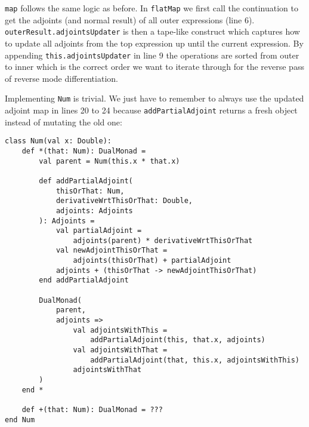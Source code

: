 \lstinline{map} follows the same logic as before. In \lstinline{flatMap} we first call the continuation to get the adjoints (and normal result) of all outer expressions (line 6). \lstinline{outerResult.adjointsUpdater} is then a tape-like construct which captures how to update all adjoints from the top expression up until the current expression. By appending \lstinline{this.adjointsUpdater} in line 9 the operations are sorted from outer to inner which is the correct order we want to iterate through for the reverse pass of reverse mode differentiation.

Implementing \lstinline{Num} is trivial. We just have to remember to always use the updated adjoint map in lines 20 to 24 because \lstinline{addPartialAdjoint} returns a fresh object instead of mutating the old one:
\begin{lstlisting}
class Num(val x: Double):
    def *(that: Num): DualMonad =
        val parent = Num(this.x * that.x)

        def addPartialAdjoint(
            thisOrThat: Num, 
            derivativeWrtThisOrThat: Double, 
            adjoints: Adjoints
        ): Adjoints =
            val partialAdjoint = 
                adjoints(parent) * derivativeWrtThisOrThat
            val newAdjointThisOrThat = 
                adjoints(thisOrThat) + partialAdjoint
            adjoints + (thisOrThat -> newAdjointThisOrThat)
        end addPartialAdjoint

        DualMonad(
            parent,
            adjoints =>
                val adjointsWithThis = 
                    addPartialAdjoint(this, that.x, adjoints)
                val adjointsWithThat = 
                    addPartialAdjoint(that, this.x, adjointsWithThis)
                adjointsWithThat
        )
    end *

    def +(that: Num): DualMonad = ???
end Num
\end{lstlisting}

